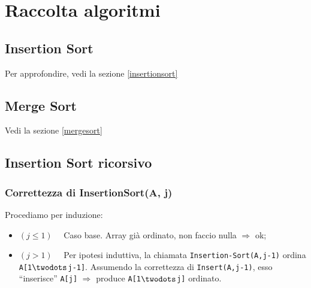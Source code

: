 \appendix
\appendixpage
\addappheadtotoc 

\section{Raccolta algoritmi}

\subsection{Insertion Sort}
Per approfondire, vedi la sezione \ref{insertionsort} 


\subsection{Merge Sort}
Vedi la sezione \ref{mergesort}



\subsection{Insertion Sort ricorsivo}




\subsubsection{Correttezza di InsertionSort(A, j)}
Procediamo per induzione:
\begin{itemize}
	\item[] $(j \leq 1) \quad$ Caso base. Array già ordinato, non faccio nulla $\Rightarrow$ ok;
	\item[] $(j > 1) \quad$ Per ipotesi induttiva, la chiamata \texttt{Insertion-Sort(A,j-1)}
	ordina \texttt{A[1$\twodots$j-1]}. Assumendo la correttezza di \texttt{Insert(A,j-1)}, esso
	``inserisce'' \texttt{A[j]} $\Rightarrow$ produce \texttt{A[1$\twodots$j]} ordinato.
\end{itemize}

